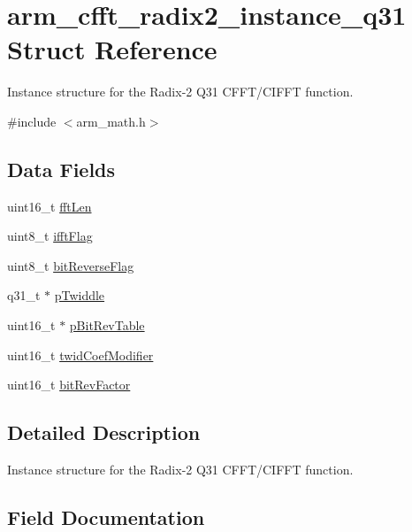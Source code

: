 \hypertarget{structarm__cfft__radix2__instance__q31}{}\section{arm\+\_\+cfft\+\_\+radix2\+\_\+instance\+\_\+q31 Struct Reference}
\label{structarm__cfft__radix2__instance__q31}


Instance structure for the Radix-\/2 Q31 C\+F\+F\+T/\+C\+I\+F\+FT function.  




{\ttfamily \#include $<$arm\+\_\+math.\+h$>$}

\subsection*{Data Fields}
\begin{DoxyCompactItemize}
\item 
uint16\+\_\+t \hyperlink{structarm__cfft__radix2__instance__q31_ab8db3bbe7c61e6bb8ca2a55e3446e11a}{fft\+Len}
\item 
uint8\+\_\+t \hyperlink{structarm__cfft__radix2__instance__q31_ad6ca6e223f986ebfd94c5ee1e410aa73}{ifft\+Flag}
\item 
uint8\+\_\+t \hyperlink{structarm__cfft__radix2__instance__q31_a09a221a818c6d0e064557a99e2fe9a8b}{bit\+Reverse\+Flag}
\item 
q31\+\_\+t $\ast$ \hyperlink{structarm__cfft__radix2__instance__q31_a2505b7d5ec077b244c712797a5253b6d}{p\+Twiddle}
\item 
uint16\+\_\+t $\ast$ \hyperlink{structarm__cfft__radix2__instance__q31_a46a2fb328199897af100fea0bfdf59aa}{p\+Bit\+Rev\+Table}
\item 
uint16\+\_\+t \hyperlink{structarm__cfft__radix2__instance__q31_afe772e5b5001c9d8e85032115a8df5bf}{twid\+Coef\+Modifier}
\item 
uint16\+\_\+t \hyperlink{structarm__cfft__radix2__instance__q31_a33386d95319dc3ee7097b3a8e52e01ec}{bit\+Rev\+Factor}
\end{DoxyCompactItemize}


\subsection{Detailed Description}
Instance structure for the Radix-\/2 Q31 C\+F\+F\+T/\+C\+I\+F\+FT function. 

\subsection{Field Documentation}
\mbox{\label{structarm__cfft__radix2__instance__q31_a09a221a818c6d0e064557a99e2fe9a8b}} 
